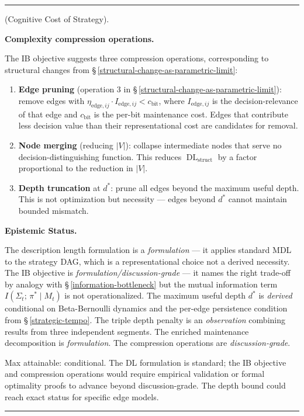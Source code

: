 \documentclass[11pt,oneside]{article}
\newcounter{claim}[section]
\renewcommand{\theclaim}{\thesection.\arabic{claim}}
\newenvironment{segment}[2]{%
  \refstepcounter{claim}%
  \bigskip\noindent\hrule\smallskip
  \noindent{\bfseries #1~\theclaim}\enskip(#2).\par\smallskip
  \noindent\ignorespaces
}{%
  \par\smallskip\noindent\hrule\bigskip
}
\newenvironment{formulation}[1][]{\begin{segment}{Formulation}{#1}}{\end{segment}}
\begin{document}
\begin{formulation}[Cognitive Cost of Strategy]
\medskip\noindent\textbf{Complexity compression operations.}



The IB objective suggests three compression operations, corresponding to structural changes from \S\,\ref{structural-change-as-parametric-limit}:

\begin{enumerate}
  \item \textbf{Edge pruning} (operation 3 in \S\,\ref{structural-change-as-parametric-limit}): remove edges with $\eta_{\text{edge},ij} \cdot I_{\text{edge},ij} < c_{\text{bit}}$, where $I_{\text{edge},ij}$ is the decision-relevance of that edge and $c_{\text{bit}}$ is the per-bit maintenance cost. Edges that contribute less decision value than their representational cost are candidates for removal.
  \item \textbf{Node merging} (reducing $\lvert V\rvert$): collapse intermediate nodes that serve no decision-distinguishing function. This reduces $\operatorname{DL}_{\text{struct}}$ by a factor proportional to the reduction in $\lvert V\rvert$.
  \item \textbf{Depth truncation} at $d^*$: prune all edges beyond the maximum useful depth. This is not optimization but necessity --- edges beyond $d^*$ cannot maintain bounded mismatch.
\end{enumerate}



\medskip\noindent\textbf{Epistemic Status.}


The description length formulation is a \textit{formulation} --- it applies standard MDL to the strategy DAG, which is a representational choice not a derived necessity. The IB objective is \textit{formulation/discussion-grade} --- it names the right trade-off by analogy with \S\,\ref{information-bottleneck} but the mutual information term $I(\Sigma_t;\, \pi^* \mid M_t)$ is not operationalized. The maximum useful depth $d^*$ is \textit{derived} conditional on Beta-Bernoulli dynamics and the per-edge persistence condition from \S\,\ref{strategic-tempo}. The triple depth penalty is an \textit{observation} combining results from three independent segments. The enriched maintenance decomposition is \textit{formulation}. The compression operations are \textit{discussion-grade}.

Max attainable: conditional. The DL formulation is standard; the IB objective and compression operations would require empirical validation or formal optimality proofs to advance beyond discussion-grade. The depth bound could reach exact status for specific edge models.



\end{formulation}
\end{document}
